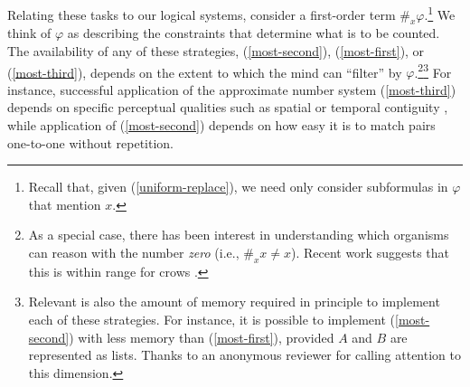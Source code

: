 \documentclass[12pt,oneside,reqno]{amsart}
\theoremstyle{definition}
\begin{document}
Relating these tasks to our logical systems, consider a first-order term $\#_x\varphi$.\footnote{Recall that, given (\ref{uniform-replace}), we need only consider subformulas in $\varphi$ that mention $x$.} We think of $\varphi$ as describing the constraints that determine what is to be counted. The availability of any of these strategies,  (\ref{most-second}), (\ref{most-first}), or (\ref{most-third}),  depends on the extent to which the mind can ``filter'' by $\varphi$.\footnote{As a special case, there has been interest in understanding which organisms can reason with the number \emph{zero} (i.e., $\#_x x\neq x$). Recent work suggests that this is  within range for crows \citep{Kirschhock4889}.}\footnote{Relevant is also the amount of memory required in principle to implement each of these strategies. For instance, it is possible to implement (\ref{most-second}) with less memory than (\ref{most-first}), provided $A$ and $B$ are represented as lists. Thanks to an anonymous reviewer for calling attention to this dimension.} For instance, successful application of the approximate number system (\ref{most-third}) depends on specific perceptual qualities such as spatial or temporal contiguity \citep{Dehaene}, while application of (\ref{most-second}) depends on how easy it is to match pairs one-to-one without repetition.
\end{document}
